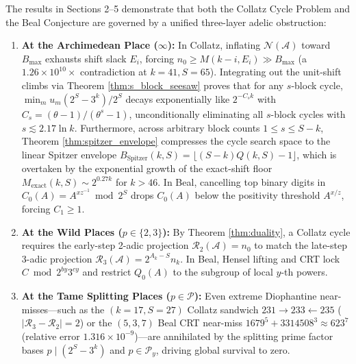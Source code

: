 \documentclass[11pt, a4paper]{amsart}
\theoremstyle{definition}
\newcommand{\N}{\mathcal{N}}
\newcommand{\A}{\mathcal{A}}
\newcommand{\Rcal}{\mathcal{R}}
\newcommand{\Py}{\mathcal{P}_y}
\begin{document}
The results in Sections 2--5 demonstrate that both the Collatz Cycle Problem and the Beal Conjecture are governed by a unified three-layer adelic obstruction:
\begin{enumerate}
    \item \textbf{At the Archimedean Place ($\infty$):} In Collatz, inflating $\N(\A)$ toward $B_{\max}$ exhausts shift slack $E_i$, forcing $n_0 \ge M(k-i, E_i) \gg B_{\max}$ (a $1.26 \times 10^{10}\times$ contradiction at $k=41, S=65$). Integrating out the unit-shift climbs via Theorem \ref{thm:s_block_seesaw} proves that for any $s$-block cycle, $\min_m u_m (2^S - 3^k)/2^S$ decays exponentially like $2^{-C_s k}$ with $C_s = (\theta - 1)/(\theta^s - 1)$, unconditionally eliminating all $s$-block cycles with $s \lesssim 2.17 \ln k$. Furthermore, across arbitrary block counts $1 \le s \le S - k$, Theorem \ref{thm:spitzer_envelope} compresses the cycle search space to the linear Spitzer envelope $B_{\text{Spitzer}}(k, S) = \lfloor (S - k) Q(k, S) - 1 \rfloor$, which is overtaken by the exponential growth of the exact-shift floor $M_{\text{exact}}(k, S) \sim 2^{0.27 k}$ for $k > 46$. In Beal, cancelling top binary digits in $C_0(A) = A^{x z^{-1}} \bmod 2^S$ drops $C_0(A)$ below the positivity threshold $A^{x/z}$, forcing $C_1 \ge 1$.
    \item \textbf{At the Wild Places ($p \in \{2, 3\}$):} By Theorem \ref{thm:duality}, a Collatz cycle requires the early-step 2-adic projection $\Rcal_2(\A) = n_0$ to match the late-step 3-adic projection $\Rcal_3(\A) = 2^{A_k-S} n_k$. In Beal, Hensel lifting and CRT lock $C \bmod 2^{by} 3^{cy}$ and restrict $Q_0(A)$ to the subgroup of local $y$-th powers.
    \item \textbf{At the Tame Splitting Places ($p \in \mathcal{P}$):} Even extreme Diophantine near-misses—such as the $(k=17, S=27)$ Collatz sandwich $231 \to 233 \leftarrow 235$ ($|\Rcal_3 - \Rcal_2| = 2$) or the $(5,3,7)$ Beal CRT near-miss $1679^5 + 3314508^3 \approx 623^7$ (relative error $1.316 \times 10^{-9}$)—are annihilated by the splitting prime factor bases $p \mid (2^S - 3^k)$ and $p \in \Py$, driving global survival to zero.
\end{enumerate}
\end{document}
